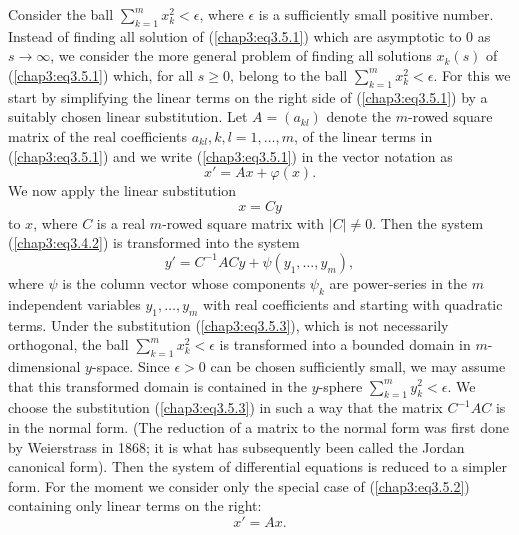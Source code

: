 Consider the ball $\sum\limits^m_{k=1} x^2_k < \epsilon$, where
$\epsilon$ is a sufficiently small positive number. Instead of finding
all solution of (\ref{chap3:eq3.5.1}) which are asymptotic to 0 as $s
\to \infty$, we consider the more general problem of finding all
solutions $x_k(s)$ of (\ref{chap3:eq3.5.1}) which, for all $s \geq 0$,
belong to the ball $\sum\limits^m_{k=1} x^2_k < \epsilon$. For this we
start by simplifying the linear terms on the right side of
(\ref{chap3:eq3.5.1}) by a suitably chosen linear substitution. Let $A
= (a_{kl})$ denote the $m$-rowed square matrix of the real
coefficients $a_{kl}, k, l = 1 , \ldots, m$, of the linear terms in
(\ref{chap3:eq3.5.1}) and we write (\ref{chap3:eq3.5.1}) in the vector
notation as 
\begin{equation*}
x' = A x + \varphi (x). \tag{3.5.2}\label{chap3:eq3.5.2}
\end{equation*}
We now apply the linear substitution
\begin{equation*}
x = Cy \tag{3.5.3}\label{chap3:eq3.5.3}
\end{equation*}\pageoriginale
to $x$, where $C$ is a real $m$-rowed square matrix with $|C| \neq
0$. Then the system (\ref{chap3:eq3.4.2}) is transformed into the
system 
\begin{equation*}
y' = C^{-1} A C y +\psi (y_1, \ldots, y_m),
\tag{3.5.4}\label{chap3:eq3.5.4} 
\end{equation*}
where $\psi$ is the column vector whose components $\psi_k$ are
power-series in the $m$ independent variables $y_1, \ldots, y_m$ with
real coefficients and starting with quadratic terms. Under the
substitution (\ref{chap3:eq3.5.3}), which is not necessarily
orthogonal, the ball $\sum\limits^m_{k=1} x^2_k < \epsilon$ is
transformed into a bounded domain in $m$-dimensional $y$-space. Since
$\epsilon > 0$ can be chosen sufficiently small, we may assume that
this transformed domain is contained in the $y$-sphere
$\sum\limits^m_{k=1} y^2_k < \epsilon$. We choose the substitution
(\ref{chap3:eq3.5.3}) in such a way that the matrix $C^{-1} A C$ is in
the normal form. (The reduction of a matrix to the normal form was
first done by Weierstrass in 1868; it is what has subsequently been
called the Jordan canonical form). Then the system of differential
equations is reduced to a simpler form. For the moment we consider
only the special case of (\ref{chap3:eq3.5.2}) containing only linear
terms on the right: 
\begin{equation*}
x' = Ax. \tag{3.5.5}\label{chap3:eq3.5.5}
\end{equation*}
